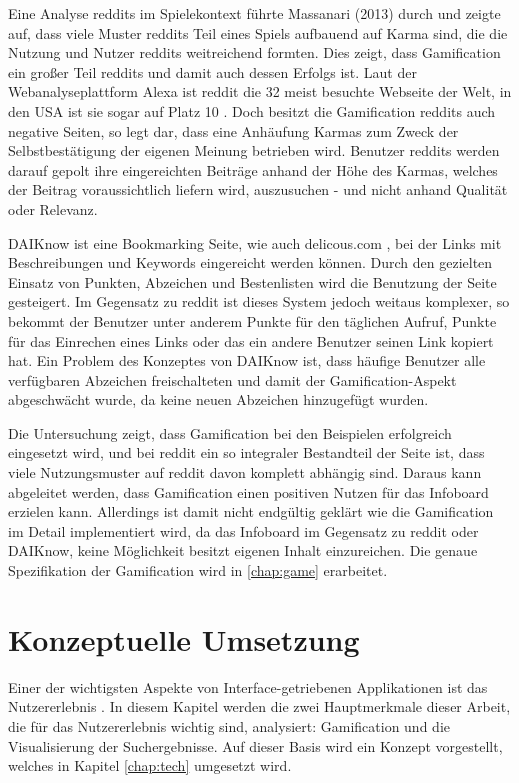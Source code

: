 \documentclass[12pt,twoside]{book}
\begin{document}
Eine Analyse reddits im Spielekontext führte Massanari (2013) durch und zeigte auf, dass viele Muster reddits Teil eines Spiels aufbauend auf Karma sind, die die Nutzung und Nutzer reddits weitreichend formten.
Dies zeigt, dass Gamification ein großer Teil reddits und damit auch dessen Erfolgs ist. Laut der Webanalyseplattform Alexa ist reddit die 32 meist besuchte Webseite der Welt, in den USA ist sie sogar auf Platz 10 \cite{alexa}.
Doch besitzt die Gamification reddits auch negative Seiten, so legt \citep{richerichkarma}  dar, dass eine Anhäufung Karmas zum Zweck der Selbstbestätigung der eigenen Meinung betrieben wird. Benutzer reddits werden darauf gepolt ihre eingereichten Beiträge anhand der Höhe des Karmas, welches der Beitrag voraussichtlich liefern wird, auszusuchen - und nicht anhand Qualität oder Relevanz.

DAIKnow \citep{meder2014daiknow} ist eine Bookmarking Seite, wie auch delicous.com \cite{delicious}, bei der Links mit Beschreibungen und Keywords eingereicht werden können. Durch den gezielten Einsatz von Punkten, Abzeichen und Bestenlisten wird die Benutzung der Seite gesteigert. Im Gegensatz zu reddit ist dieses System jedoch weitaus komplexer, so bekommt der Benutzer unter anderem Punkte für den täglichen Aufruf, Punkte für das Einrechen eines Links oder das ein andere Benutzer seinen Link kopiert hat.
Ein Problem des Konzeptes von DAIKnow ist, dass häufige Benutzer alle verfügbaren Abzeichen freischalteten und damit der Gamification-Aspekt abgeschwächt wurde, da keine neuen Abzeichen hinzugefügt wurden.

Die Untersuchung zeigt, dass Gamification bei den Beispielen erfolgreich eingesetzt wird, und bei reddit ein so integraler Bestandteil der Seite ist, dass viele Nutzungsmuster auf reddit davon komplett abhängig sind. Daraus kann abgeleitet werden, dass Gamification einen positiven Nutzen für das Infoboard erzielen kann. Allerdings ist damit nicht endgültig geklärt wie die Gamification im Detail implementiert wird, da das Infoboard im Gegensatz zu reddit oder DAIKnow, keine Möglichkeit besitzt eigenen Inhalt einzureichen. Die genaue Spezifikation der Gamification wird in \ref{chap:game} erarbeitet.

\chapter{Konzeptuelle Umsetzung}\label{chap:concept}

Einer der wichtigsten Aspekte von Interface-getriebenen Applikationen ist das Nutzererlebnis \citep[8 - 17]{garrett2010elements}. In diesem Kapitel werden die zwei Hauptmerkmale dieser Arbeit, die für das Nutzererlebnis wichtig sind, analysiert: Gamification und die Visualisierung der Suchergebnisse. Auf dieser Basis wird ein Konzept vorgestellt, welches in Kapitel \ref{chap:tech} umgesetzt wird.
\end{document}
